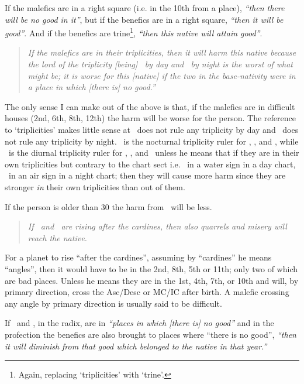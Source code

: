 If  the malefics are in a right square (i.e. in the 10th from a place), \textsl{``then there will be no good in it''}, but if the benefics are in a right square, \textsl{``then it will be good''}. And if the benefics are trine\footnote{Again, replacing `triplicities' with `trine'.}, \textsl{``then this native will attain good''}.

\begin{quote}
\textsl{If the malefics are in their triplicities, then it will harm this native because the lord of the triplicity [being] \Mars\, by day and \Saturn\, by night is the worst of what might be; it is worse for this [native] if the two in the base-nativity were in a place in which [there is] no good.''}
\end{quote}

\begin{mdframed}[backgroundcolor=cyan!5, rightmargin=1em, leftmargin=1em]
The only sense I can make out of the above is that, if the malefics are in difficult houses (2nd, 6th, 8th, 12th) the harm will be worse for the person. The reference to `triplicities' makes little sense at \Mars\, does not rule any triplicity by day and \Saturn\, does not rule any triplicity by night. \Mars\, is the nocturnal triplicity ruler for \Cancer, \Scorpio, and \Pisces, while \Saturn\, is the diurnal triplicity ruler for \Gemini, \Libra, and \Aquarius\, unless he means that if they are in their own triplicities but contrary to the chart sect i.e. \Mars\, in a water sign in a day chart, \Saturn\, in an air sign in a night chart; then they will cause more harm since they are stronger \textsl{in} their own triplicities than out of them.
\end{mdframed}

If  the person is older than 30 the harm from \Saturn\, will be less.

\begin{quote}
 \textsl{If \Saturn\, and \Mars\, are rising after the cardines, then also quarrels and misery will reach the native.}
\end{quote}

\begin{mdframed}[backgroundcolor=cyan!5, rightmargin=1em, leftmargin=1em]
For a planet to rise ``after the cardines'', assuming by ``cardines'' he means ``angles'', then it would have to be in the 2nd, 8th, 5th or 11th; only two of which are bad places. Unless he means they are in the 1st, 4th, 7th, or 10th and will, by primary direction, cross the Asc/Desc or MC/IC  after birth. A malefic crossing any angle by primary direction is usually said to be difficult.
\end{mdframed}

If  \Saturn\, and \Mars, in the radix, are in \textsl{``places in which [there is] no good''} and in the profection the benefics are also brought to places where ``there is no good'', \textsl{``then it will diminish from that good which belonged to the native in that year.''}



